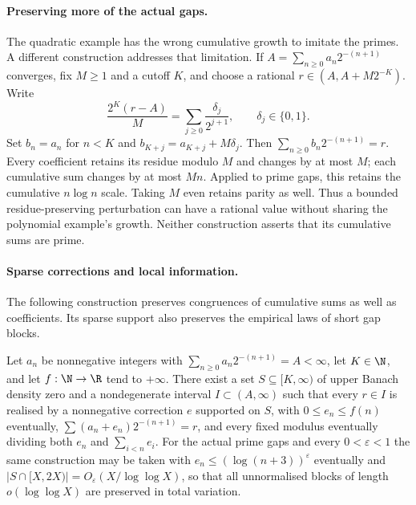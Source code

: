\documentclass[11pt]{article}
\begin{document}
\paragraph{Preserving more of the actual gaps.}
The quadratic example has the wrong cumulative growth to imitate the primes.
A different construction addresses that limitation.  If
$A=\sum_{n\ge0}a_n2^{-(n+1)}$ converges, fix $M\ge1$ and a cutoff $K$, and
choose a rational $r\in(A,A+M2^{-K})$.  Write
\[
 \frac{2^K(r-A)}{M}=\sum_{j\ge0}\frac{\delta_j}{2^{j+1}},
 \qquad \delta_j\in\{0,1\}.
\]
Set $b_n=a_n$ for $n<K$ and $b_{K+j}=a_{K+j}+M\delta_j$.  Then
$\sum_{n\ge0}b_n2^{-(n+1)}=r$.  Every coefficient retains its residue
modulo $M$ and changes by at most $M$; each cumulative sum changes by at
most $Mn$.  Applied to prime gaps, this retains the cumulative
$n\log n$ scale.  Taking $M$ even retains parity as well.  Thus a bounded
residue-preserving perturbation can have a rational value without sharing
the polynomial example's growth.  Neither construction asserts that its
cumulative sums are prime.

\paragraph{Sparse corrections and local information.}
The following construction preserves congruences of cumulative sums as well
as coefficients.  Its sparse support also preserves the empirical laws of
short gap blocks.

\begin{proposition}\label{res:sparserationalisation}
Let $a_n$ be nonnegative integers with $\sum_{n\ge0}a_n2^{-(n+1)}=A<\infty$,
let $K\in\N$, and let $f:\N\to\R$ tend to $+\infty$.  There exist a set
$S\subseteq[K,\infty)$ of upper Banach density zero and a nondegenerate
interval $I\subset(A,\infty)$ such that every $r\in I$ is realised by a
nonnegative correction $e$ supported on $S$, with $0\le e_n\le f(n)$
eventually, $\sum(a_n+e_n)2^{-(n+1)}=r$, and every fixed modulus eventually
dividing both $e_n$ and $\sum_{i<n}e_i$.  For the actual prime gaps and
every $0<\varepsilon<1$ the same construction may be taken with
$e_n\le(\log(n+3))^\varepsilon$ eventually and
$|S\cap[X,2X)|=O_\varepsilon(X/\log\log X)$, so that all unnormalised blocks
of length $o(\log\log X)$ are preserved in total variation.
\end{proposition}
\end{document}
